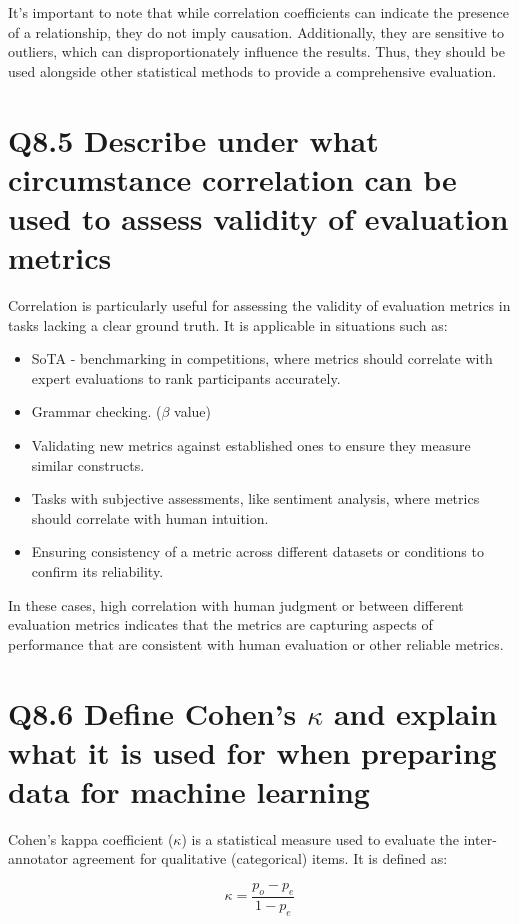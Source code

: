 \documentclass[11pt]{article}
\begin{document}
It's important to note that while correlation coefficients can indicate the presence of a relationship, they do not imply causation. Additionally, they are sensitive to outliers, which can disproportionately influence the results. Thus, they should be used alongside other statistical methods to provide a comprehensive evaluation.

\section{Q8.5 Describe under what circumstance correlation can be used to assess validity of evaluation metrics}

Correlation is particularly useful for assessing the validity of evaluation metrics in tasks lacking a clear ground truth. It is applicable in situations such as:

\begin{itemize}
\item SoTA - benchmarking in competitions, where metrics should correlate with expert evaluations to rank participants accurately.
\item Grammar checking. ($\beta$ value)
\item Validating new metrics against established ones to ensure they measure similar constructs.
\item Tasks with subjective assessments, like sentiment analysis, where metrics should correlate with human intuition.
\item Ensuring consistency of a metric across different datasets or conditions to confirm its reliability.
\end{itemize}

In these cases, high correlation with human judgment or between different evaluation metrics indicates that the metrics are capturing aspects of performance that are consistent with human evaluation or other reliable metrics.

\section{Q8.6 Define Cohen's \(\kappa\) and explain what it is used for when preparing data for machine learning}

Cohen's kappa coefficient (\(\kappa\)) is a statistical measure used to evaluate the inter-annotator agreement for qualitative (categorical) items. It is defined as:

\[
\kappa = \frac{p_o - p_e}{1 - p_e}
\]
\end{document}
